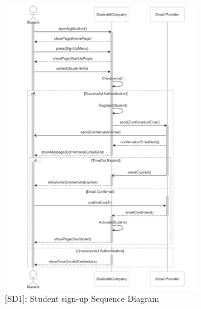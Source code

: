 \begin{figure}[H]
    \centering
    \includegraphics[width=0.75\textwidth]{Latex/Images/StudentSignUpSequenceDiagram.png}
    \caption{[SD1]: Student sign-up Sequence Diagram}
    \label{fig:SD1}
\end{figure}
\clearpage

